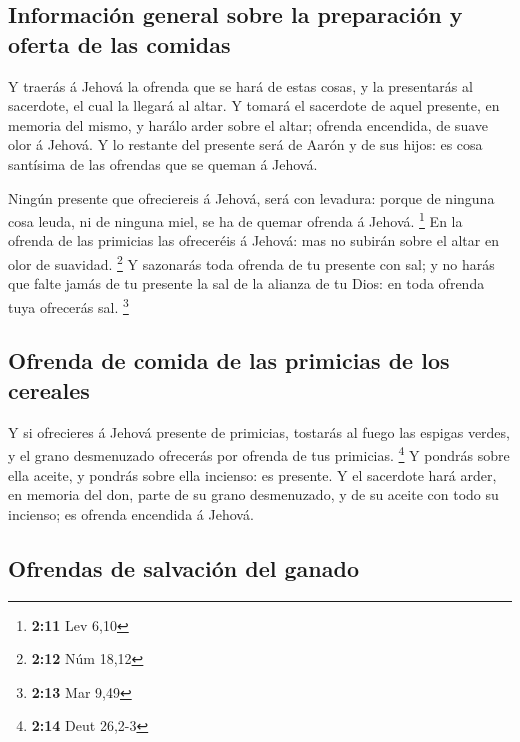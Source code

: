 \hypertarget{informaciuxf3n-general-sobre-la-preparaciuxf3n-y-oferta-de-las-comidas}{%
\subsection{Información general sobre la preparación y oferta de las
comidas}\label{informaciuxf3n-general-sobre-la-preparaciuxf3n-y-oferta-de-las-comidas}}

 Y traerás á Jehová la ofrenda que se hará de estas cosas, y
la presentarás al sacerdote, el cual la llegará al altar.  Y
tomará el sacerdote de aquel presente, en memoria del mismo, y harálo
arder sobre el altar; ofrenda encendida, de suave olor á Jehová.
 Y lo restante del presente será de Aarón y de sus hijos:
es cosa santísima de las ofrendas que se queman á Jehová.

 Ningún presente que ofreciereis á Jehová, será con
levadura: porque de ninguna cosa leuda, ni de ninguna miel, se ha de
quemar ofrenda á Jehová. \footnote{\textbf{2:11} Lev 6,10} 
En la ofrenda de las primicias las ofreceréis á Jehová: mas no subirán
sobre el altar en olor de suavidad. \footnote{\textbf{2:12} Núm 18,12}
 Y sazonarás toda ofrenda de tu presente con sal; y no
harás que falte jamás de tu presente la sal de la alianza de tu Dios: en
toda ofrenda tuya ofrecerás sal. \footnote{\textbf{2:13} Mar 9,49}

\hypertarget{ofrenda-de-comida-de-las-primicias-de-los-cereales}{%
\subsection{Ofrenda de comida de las primicias de los
cereales}\label{ofrenda-de-comida-de-las-primicias-de-los-cereales}}

 Y si ofrecieres á Jehová presente de primicias, tostarás
al fuego las espigas verdes, y el grano desmenuzado ofrecerás por
ofrenda de tus primicias. \footnote{\textbf{2:14} Deut 26,2-3}
 Y pondrás sobre ella aceite, y pondrás sobre ella
incienso: es presente.  Y el sacerdote hará arder, en
memoria del don, parte de su grano desmenuzado, y de su aceite con todo
su incienso; es ofrenda encendida á Jehová.

\hypertarget{ofrendas-de-salvaciuxf3n-del-ganado}{%
\subsection{Ofrendas de salvación del
ganado}\label{ofrendas-de-salvaciuxf3n-del-ganado}}

